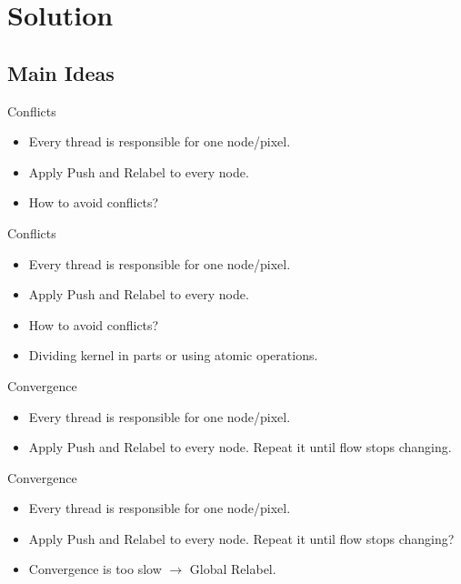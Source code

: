 \documentclass{beamer}
\begin{document}
\section{Solution}

\subsection{Main Ideas}

\begin{frame}{Conflicts}
\begin{itemize}
 \item
 Every thread is responsible for one node/pixel.
 \item
 Apply Push and Relabel to every node.
 \item
 \alert{How to avoid conflicts?}
\end{itemize}
\end{frame}

\begin{frame}{Conflicts}
\begin{itemize}
 \item
 Every thread is responsible for one node/pixel.
 \item
 Apply Push and Relabel to every node.
 \item
 \alert{How to avoid conflicts?}
 \item
 Dividing kernel in parts or using atomic operations.
\end{itemize}
\end{frame}

\begin{frame}{Convergence}
\begin{itemize}
 \item
 Every thread is responsible for one node/pixel.
 \item
 Apply Push and Relabel to every node. \alert{Repeat it until flow stops changing.}
\end{itemize}
\end{frame}

\begin{frame}{Convergence}
\begin{itemize}
 \item
 Every thread is responsible for one node/pixel.
 \item
 Apply Push and Relabel to every node. \alert{Repeat it until flow stops changing?}
 \item
 Convergence is too slow $\rightarrow$ Global Relabel.
\end{itemize}
\end{frame}
\end{document}
